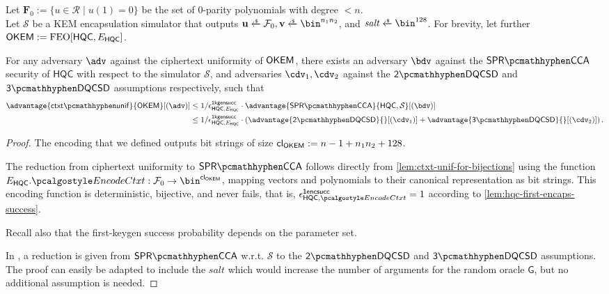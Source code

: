 \begin{lemma}
\label{lem:hqc-ctxt-unif}
    Let $\mathbf F_0 := \{u \in \mathcal R \mid u(1) = 0 \}$ be the set of 0-parity polynomials with degree $<n$. \\
    Let $\mathcal S$ be a KEM encapsulation simulator that outputs $\mathbf u \getsr \mathcal F_0, \mathbf v \getsr \bin^{n_1n_2}$, and $\mathit{salt} \getsr \bin^{128}$.
    For brevity, let further $\mathsf{OKEM} := \textsf{\textnormal{FEO}}[\mathsf{HQC}, E_\mathsf{HQC}]$.

    For any adversary $\adv$ against the ciphertext uniformity of $\mathsf{OKEM}$, there exists an adversary $\bdv$ against the $\sprcca$ security of $\mathsf{HQC}$ with respect to the simulator $\mathcal S$, and adversaries $\cdv_1, \cdv_2$ against the $\twodqcsd$ and $\threedqcsd$ assumptions respectively, such that
    \begin{align*}
        \advantage{\ctxtunif}{\OKEM}[(\adv)]
        &\leq 1/\epsilon^\firstkeygensuccess_{\mathsf{HQC}, E_\mathsf{HQC}} \cdot \advantage{\sprcca}{\mathsf{HQC},\mathcal S}[(\bdv)] \\
        &\leq 1/\epsilon^\firstkeygensuccess_{\mathsf{HQC}, E_\mathsf{HQC}} \cdot \left(
            \advantage{\twodqcsd}{}[(\cdv_1)] + \advantage{\threedqcsd}{}[(\cdv_2)]
        \right).
    \end{align*}
\end{lemma}
\begin{proof}
    The encoding that we defined outputs bit strings of size ${\mathsf{cl}_{\mathsf{OKEM}}} := n-1+n_1n_2+128$.

    The reduction from ciphertext uniformity to $\sprcca$ follows directly from \cref{lem:ctxt-unif-for-bijections} using the function $E_\mathsf{HQC}.\encodectxt: \mathcal F_0 \to \bin^\obfctxtlen$, mapping vectors and polynomials to their canonical representation as bit strings.
    This encoding function is deterministic, bijective, and never fails, that is, $\epsilon^\firstencapssuccess_{\mathsf{HQC},\encodectxt} = 1$ according to \cref{lem:hqc-first-encaps-success}.

    Recall also that the first-keygen success probability depends on the parameter set.

    In \cite[Lemma~P.2]{EC:Xagawa22}, a reduction is given from $\sprcca$ w.r.t. $\mathcal S$ to the $\twodqcsd$ and $\threedqcsd$ assumptions. The proof can easily be adapted to include the $\mathit{salt}$ which would increase the number of arguments for the random oracle $\mathsf G$, but no additional assumption is needed.
\end{proof}

